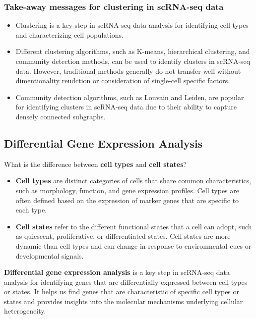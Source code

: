 \documentclass[a4paper]{article}
\begin{document}
\subsubsection*{Take-away messages for clustering in scRNA-seq data}

\begin{itemize}
  \item Clustering is a key step in scRNA-seq data analysis for identifying
  cell types and characterizing cell populations.
  \item Different clustering algorithms, such as K-means, hierarchical clustering,
  and community detection methods, can be used to identify clusters in scRNA-seq data.
  However, traditional methods generally do not transfer well without dimentionality
  reudction or consideration of single-cell specific factors.
  \item Community detection algorithms, such as Louvain and Leiden, are popular
  for identifying clusters in scRNA-seq data due to their ability to capture
  densely connected subgraphs.
\end{itemize}

\subsection*{Differential Gene Expression Analysis}

What is the difference between \textbf{cell types} and \textbf{cell states}?

\begin{itemize}
  \item \textbf{Cell types} are distinct categories of cells that share
  common characteristics, such as morphology, function, and gene expression
  profiles. Cell types are often defined based on the expression of marker
  genes that are specific to each type.
  \item \textbf{Cell states} refer to the different functional states that
  a cell can adopt, such as quiescent, proliferative, or differentiated states.
  Cell states are more dynamic than cell types and can change in response
  to environmental cues or developmental signals.
\end{itemize}

\textbf{Differential gene expression analysis} is a key step in scRNA-seq data
analysis for identifying genes that are differentially expressed between
cell types or states. It helps us find genes that are characteristic
of specific cell types or states and provides insights into the molecular
mechanisms underlying cellular heterogeneity.
\end{document}
